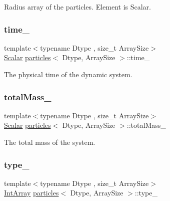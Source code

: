 Radius array of the particles. Element is Scalar. 

\mbox{\label{classparticles_a0ea87eff27f700bcaf20734b22d88d53}} 
\subsubsection{\texorpdfstring{time\+\_\+}{time\_}}
{\footnotesize\ttfamily template$<$typename Dtype , size\+\_\+t Array\+Size$>$ \\
\mbox{\hyperlink{classparticles_a57a6b6582045a4b20742b99c513e9f63}{Scalar}} \mbox{\hyperlink{classparticles}{particles}}$<$ Dtype, Array\+Size $>$\+::time\+\_\+\hspace{0.3cm}{\ttfamily [protected]}}



The physical time of the dynamic system. 

\mbox{\label{classparticles_ab84755685f1e8c6f3a2ea17c604049e0}} 
\subsubsection{\texorpdfstring{total\+Mass\+\_\+}{totalMass\_}}
{\footnotesize\ttfamily template$<$typename Dtype , size\+\_\+t Array\+Size$>$ \\
\mbox{\hyperlink{classparticles_a57a6b6582045a4b20742b99c513e9f63}{Scalar}} \mbox{\hyperlink{classparticles}{particles}}$<$ Dtype, Array\+Size $>$\+::total\+Mass\+\_\+\hspace{0.3cm}{\ttfamily [protected]}}



The total mass of the system. 

\mbox{\label{classparticles_ac7293cffd3198ae98d1124af27a7b39c}} 
\subsubsection{\texorpdfstring{type\+\_\+}{type\_}}
{\footnotesize\ttfamily template$<$typename Dtype , size\+\_\+t Array\+Size$>$ \\
\mbox{\hyperlink{classparticles_a1b766bf5ccced2005beaacbb07e46bf9}{Int\+Array}} \mbox{\hyperlink{classparticles}{particles}}$<$ Dtype, Array\+Size $>$\+::type\+\_\+\hspace{0.3cm}{\ttfamily [protected]}}



